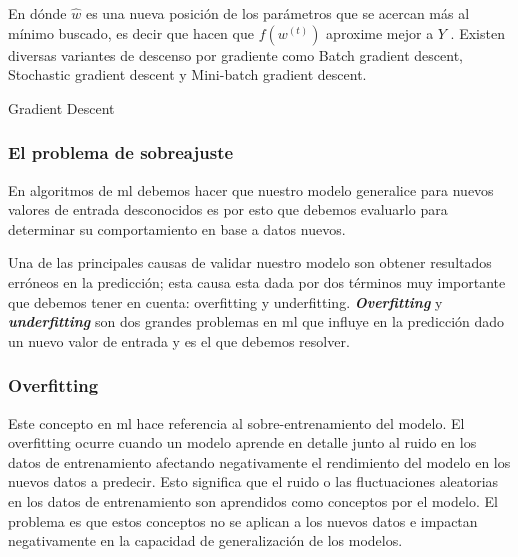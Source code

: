 En dónde $\hat{w}$ es una nueva posición de los parámetros que se acercan más al mínimo buscado, es decir que hacen que $f(w^{(t)})$ aproxime mejor a $Y$ . Existen diversas variantes de descenso por gradiente como Batch gradient descent, Stochastic gradient descent y Mini-batch gradient descent.


\begin{algorithm}[H]
\caption{Gradient Descent}\label{euclid}
\begin{algorithmic}[1]

\State $\textbf{INPUT} \gets (X, Y, \theta,iteraciones, \alpha)$
\State $\textbf{OUTPUT} \gets \theta $
\State \textbf{i} = 0
\While {\textbf{i} <  iteraciones}{
\State i++
\State	error = \textit{FunciónCosto}(X, Y, \theta)

\If {error < minerror}
	\State	break
\Else
	\State \texttt{\theta_{j} := \theta_{j} - \alpha \frac{\partial}{\partial \theta} J(\theta_{1}, \theta_{0})}
	
\EndIf
\EndWhile
\end{algorithmic}
\end{algorithm}



\subsubsection{El problema de sobreajuste}\label{sub:validacion-modelo}

En algoritmos de \ac{ml} debemos hacer que nuestro modelo generalice para nuevos valores de entrada desconocidos es por esto que debemos evaluarlo para determinar su comportamiento en base a datos nuevos. 

Una de las principales causas de validar nuestro modelo son obtener resultados erróneos en la predicción; esta causa esta dada por dos términos muy importante que debemos tener en cuenta: overfitting y underfitting. \textit{\textbf{Overfitting}} y \textit{\textbf{underfitting}} son dos grandes problemas en \ac{ml} que influye en la predicción dado un nuevo valor de entrada y es el que debemos resolver. 

\subsubsection*{Overfitting}
Este concepto en \ac{ml} hace referencia al sobre-entrenamiento del modelo. El overfitting ocurre cuando un modelo aprende en detalle junto al ruido en los datos de entrenamiento afectando negativamente el rendimiento del modelo en los nuevos datos a predecir. Esto significa que el ruido o las fluctuaciones aleatorias en los datos de entrenamiento son aprendidos como conceptos por el modelo. El problema es que estos conceptos no se aplican a los nuevos datos e impactan negativamente en la capacidad de generalización de los modelos.

